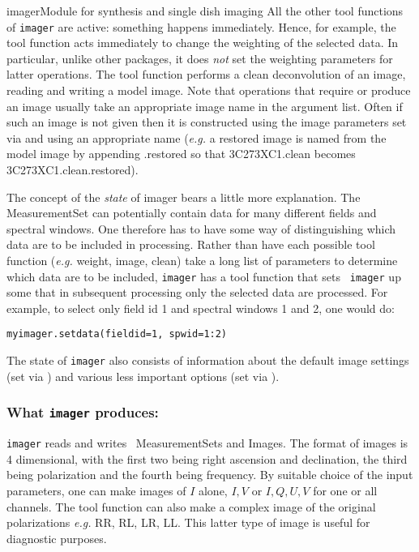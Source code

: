 \begin{ahmodule}{imager}{Module for synthesis and single dish imaging}
All the other tool functions of {\tt imager} are active: something happens
immediately. Hence, for example, the 
tool function acts immediately to change the weighting of the selected
data. In particular, unlike other packages, it does {\em not} set the
weighting parameters for latter operations. The
 tool function performs a clean deconvolution of
an image, reading and writing a model image. Note that operations that
require or produce an image usually take an appropriate image name in
the argument list.  Often if such an image is not given then it is
constructed using the image parameters set via
 and using an appropriate name
({\em e.g.} a restored image is named from the model image by
appending .restored so that 3C273XC1.clean becomes
3C273XC1.clean.restored).

The concept of the {\em state} of imager bears a little more
explanation.  The MeasurementSet can potentially contain data for many
different fields and spectral windows. One therefore has to have some
way of distinguishing which data are to be included in
processing. Rather than have each possible tool function ({\em e.g.}
weight, image, clean) take a long list of parameters to determine
which data are to be included, {\tt imager} has a
 tool function that sets {\tt
imager} up some that in subsequent processing only the selected data
are processed. For example, to select only field id 1 and spectral
windows 1 and 2, one would do:

\begin{verbatim}
myimager.setdata(fieldid=1, spwid=1:2)
\end{verbatim}

The state of {\tt imager} also consists of information about the
default image settings (set via )
and various less important options (set via 
).

\subsubsection*{What {\tt imager} produces:}

{\tt imager} reads and writes \aipspp\ MeasurementSets and Images.  The
format of images is 4 dimensional, with the first two being right
ascension and declination, the third being polarization and the fourth
being frequency. By suitable choice of the input parameters, one can
make images of $I$ alone, $I,V$ or $I,Q,U,V$ for one or all channels.
The  tool function can also make a complex image
of the original polarizations {\em e.g.} RR, RL, LR, LL. This latter
type of image is useful for diagnostic purposes.


\end{ahmodule}
